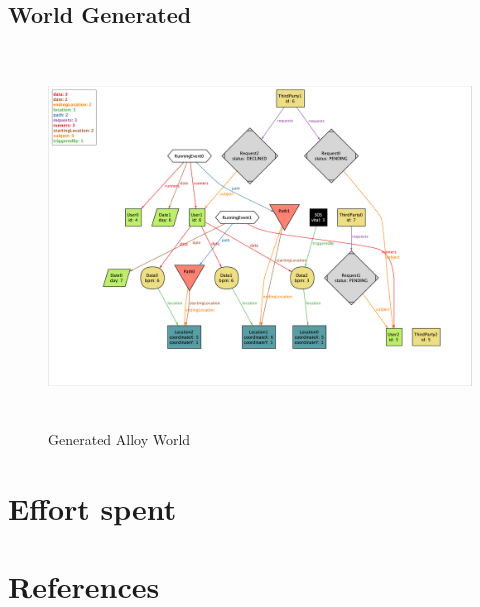 \documentclass{article}
\begin{document}
\subsection{World Generated}
\begin{figure}[ht]
\centering
    \includegraphics[height=10cm,keepaspectratio, angle=270]{Figures/AlloyWorld}
    \caption{Generated Alloy World}
\end{figure}



\newpage
\section{Effort spent}

\section{References}
\end{document}
